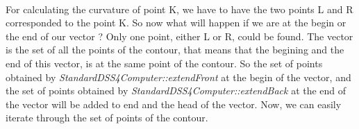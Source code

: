 \paragraph{}
For calculating the curvature of point K, we have to have the two points L and R corresponded to the point K. So now what will happen if we are at the begin or the end of our vector ? Only one point, either L or R, could be found. The vector is the set of all the points of the contour, that means that the begining and the end of this vector, is at the same point of the contour. So the set of points obtained by \textit{StandardDSS4Computer::extendFront} at the begin of the vector, and the set of points obtained by \textit{StandardDSS4Computer::extendBack} at the end of the vector will be added to end and the head of the vector. Now, we can easily iterate through the set of points of the contour.







